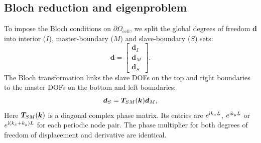\subsection{Bloch reduction and eigenproblem}
To impose the Bloch conditions on $\partial\Omega_{\mathrm{cell}}$, we split the global degrees of freedom $\bm{d}$ into interior ($I$), master-boundary ($M$) and slave-boundary ($S$) sets:
\begin{equation}
\bm{d} = \begin{bmatrix} \bm{d}_I \\ \bm{d}_M \\ \bm{d}_S \end{bmatrix}.
\label{eq:d_partition}
\end{equation}
The Bloch transformation links the slave DOFs on the top and right boundaries to the master DOFs on the bottom and left boundaries:
\begin{equation}
\bm{d}_S = \bm{T}_{SM}(\bm{k}) \bm{d}_M,
\label{eq:slave_master_rel}
\end{equation}
Here $\bm{T}_{SM}(\bm{k})$ is a diagonal complex phase matrix. Its entries are $e^{\mathrm{i} k_x L}$, $e^{\mathrm{i} k_y L}$ or $e^{\mathrm{i} (k_x + k_y)L}$ for each periodic node pair. The phase multiplier for both degrees of freedom of displacement and derivative are identical.

